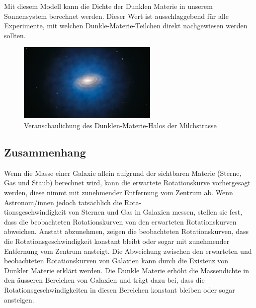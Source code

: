 Mit diesem Modell kann die Dichte der Dunklen Materie in unserem Sonnensystem berechnet werden. Dieser Wert ist ausschlaggebend für alle Experimente, mit welchen Dunkle-Materie-Teilchen direkt nachgewiesen werden sollten.
\begin{figure}[H]
	\centering
	\includegraphics[width=0.6\textwidth]{figures/dark_matter_halo.jpg}
	\caption[Abbildung 3: Dunkle Materie Halo der Milchstrasse]{Veranschaulichung des Dunklen-Materie-Halos der Milchstrasse \cite{Bührke2022}}
	\label{fig Dunkle Materie Halo}
\end{figure}

\subsection{Zusammenhang}

Wenn die Masse einer Galaxie allein aufgrund der sichtbaren Materie (Sterne, Gas und Staub) berechnet wird, kann die erwartete Rotationskurve vorhergesagt werden, diese nimmt mit zunehmender Entfernung vom Zentrum ab. 
Wenn Astronom/innen jedoch tatsächlich die Rota-\\tionsgeschwindigkeit von Sternen und Gas in Galaxien messen, stellen sie fest, dass die beobachteten Rotationskurven von den erwarteten Rotationskurven abweichen.
Anstatt abzunehmen, zeigen die beobachteten Rotationskurven, dass die Rotationsgeschwindigkeit konstant bleibt oder sogar mit zunehmender Entfernung vom Zentrum ansteigt. Die Abweichung zwischen den erwarteten und beobachteten Rotationskurven von Galaxien kann durch die Existenz von Dunkler Materie erklärt werden. 
Die Dunkle Materie erhöht die Massendichte in den äusseren Bereichen von Galaxien und trägt dazu bei, dass die Rotationsgeschwindigkeiten in diesen Bereichen konstant bleiben oder sogar ansteigen.


